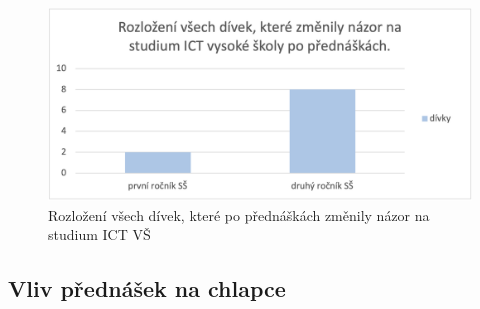 \documentclass[12pt]{report}			%
\begin{document}
                \begin{figure}[h]
                    \centering
                    \includegraphics[width=16cm]{Maturitni Prace/images/divky_prvakXdruhak.png} 
                    \caption{Rozložení všech dívek, které po přednáškách změnily názor na studium ICT VŠ }
                    \label{fig:prvak_druhak}
                \end{figure}  
        
        
           \subsection{Vliv přednášek na chlapce} 
                
\end{document}
